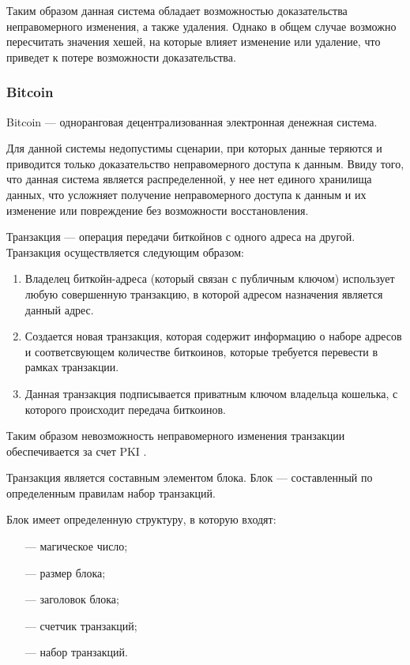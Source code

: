 Таким образом данная система обладает возможностью доказательства неправомерного изменения, а также удаления. Однако в общем случае возможно пересчитать значения хешей, на которые влияет изменение или удаление, что приведет к потере возможности доказательства.

\subsubsection{Bitcoin}

\label{par:bitcoin}

Bitcoin \cite{bitcoin} --- одноранговая децентрализованная электронная денежная система.

Для данной системы недопустимы сценарии, при которых данные теряются и приводится только доказательство неправомерного доступа к данным. Ввиду того, что данная система является распределенной, у нее нет единого хранилища данных, что усложняет получение неправомерного доступа к данным и их изменение или повреждение без возможности восстановления.

Транзакция --- операция передачи биткойнов с одного адреса на другой. Транзакция осуществляется следующим образом:

\begin{enumerate}
	\item Владелец биткойн-адреса (который связан с публичным ключом) использует любую совершенную транзакцию, в которой адресом назначения является данный адрес.
	\item Создается новая транзакция, которая содержит информацию о наборе адресов и соответсвующем количестве биткоинов, которые требуется перевести в рамках транзакции.
	\item Данная транзакция подписывается приватным ключом владельца кошелька, с которого происходит передача биткоинов.
\end{enumerate}

Таким образом невозможность неправомерного изменения транзакции обеспечивается за счет PKI \cite{pki}.

Транзакция является составным элементом блока. Блок --- составленный по определенным правилам набор транзакций.

Блок имеет определенную структуру, в которую входят:
\begin{itemize}
	\item[---] магическое число;
	\item[---] размер блока;
	\item[---] заголовок блока;
	\item[---] счетчик транзакций;
	\item[---] набор транзакций.
\end{itemize}


